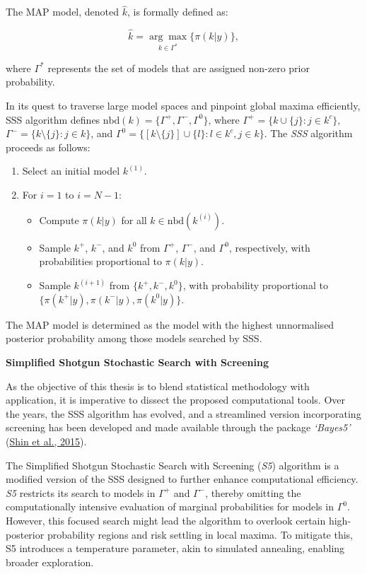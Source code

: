 \documentclass[
  11pt,
]{article}
\begin{document}
The MAP model, denoted \(\hat{k}\), is formally defined as:

\begin{equation}
\hat{k} = \underset{k \in \Gamma^*}{\arg\max} \{\pi(k | y)\},
\end{equation}

where \(\Gamma^*\) represents the set of models that are assigned
non-zero prior probability.

In its quest to traverse large model spaces and pinpoint global maxima
efficiently, SSS algorithm defines
\(\text{nbd}(k) = \{\Gamma^+, \Gamma^-, \Gamma^0\}\), where
\(\Gamma^+ = \{k \cup \{j\} : j \in k^c\}\),
\(\Gamma^- = \{k \setminus \{j\} : j \in k\}\), and
\(\Gamma^0 = \{[k \setminus \{j\}] \cup \{l\} : l \in k^c, j \in k\}\).
The \emph{SSS} algorithm proceeds as follows:

\begin{enumerate}
    \item Select an initial model $k^{(1)}$.
    \item For $i = 1$ to $i = N - 1$:
    \begin{itemize}
        \item Compute $\pi(k | y)$ for all $k \in \text{nbd}(k^{(i)})$.
        \item Sample $k^+$, $k^-$, and $k^0$ from $\Gamma^+$, $\Gamma^-$, and $\Gamma^0$, 
        respectively, with probabilities proportional to $\pi(k | y)$.
        \item Sample $k^{(i+1)}$ from $\{k^+, k^-, k^0\}$, with probability proportional to $\{\pi(k^+ | y), \pi(k^- | y), \pi(k^0 | y)\}$.
    \end{itemize}
\end{enumerate}

The MAP model is determined as the model with the highest unnormalised
posterior probability among those models searched by SSS.

\textbf{Simplified Shotgun Stochastic Search with Screening}

As the objective of this thesis is to blend statistical methodology with
application, it is imperative to dissect the proposed computational
tools. Over the years, the SSS algorithm has evolved, and a streamlined
version incorporating screening has been developed and made available
through the package \emph{`Bayes5'}
(\protect\hyperlink{ref-Shin2015}{Shin et al., 2015}).

The Simplified Shotgun Stochastic Search with Screening (\emph{S5})
algorithm is a modified version of the SSS designed to further enhance
computational efficiency. \emph{S5} restricts its search to models in
\(\Gamma^+\) and \(\Gamma^-\), thereby omitting the computationally
intensive evaluation of marginal probabilities for models in
\(\Gamma^0\). However, this focused search might lead the algorithm to
overlook certain high-posterior probability regions and risk settling in
local maxima. To mitigate this, S5 introduces a temperature parameter,
akin to simulated annealing, enabling broader exploration.
\end{document}
